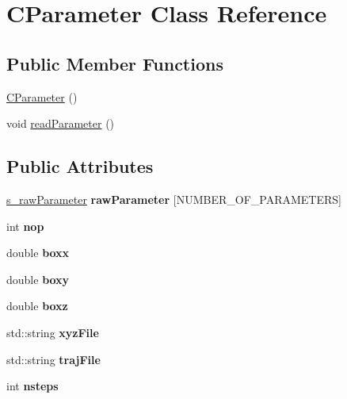 \hypertarget{classCParameter}{}\section{C\+Parameter Class Reference}
\label{classCParameter}
\subsection*{Public Member Functions}
\begin{DoxyCompactItemize}
\item 
\mbox{\hyperlink{classCParameter_aa802146fddbef2877f2034ed3dc16cd6}{C\+Parameter}} ()
\item 
void \mbox{\hyperlink{classCParameter_a026d8da357935e384b478913e036f3bc}{read\+Parameter}} ()
\end{DoxyCompactItemize}
\subsection*{Public Attributes}
\begin{DoxyCompactItemize}
\item 
\mbox{\label{classCParameter_a8c3dd5e12ba81bf46bce96e7172f08d6}} 
\mbox{\hyperlink{structs__rawParameter}{s\+\_\+raw\+Parameter}} {\bfseries raw\+Parameter} \mbox{[}N\+U\+M\+B\+E\+R\+\_\+\+O\+F\+\_\+\+P\+A\+R\+A\+M\+E\+T\+E\+RS\mbox{]}
\item 
\mbox{\label{classCParameter_adce9321ac8e877aff4d4c9fc03f74465}} 
int {\bfseries nop}
\item 
\mbox{\label{classCParameter_ab0abbb096d718eb1deac73e1c47ae324}} 
double {\bfseries boxx}
\item 
\mbox{\label{classCParameter_af770455c1829b9e2ab5cd27b7ea626be}} 
double {\bfseries boxy}
\item 
\mbox{\label{classCParameter_a87d3e3cd240bb45c5d9dcbd6c3cc3bf0}} 
double {\bfseries boxz}
\item 
\mbox{\label{classCParameter_ace7b05009f3403d4abea8a1bea18ded8}} 
std\+::string {\bfseries xyz\+File}
\item 
\mbox{\label{classCParameter_a0b417a4a872ded310baf1c310f55c284}} 
std\+::string {\bfseries traj\+File}
\item 
\mbox{\label{classCParameter_a0d4870d1e8738b7d921e35fa4068b060}} 
int {\bfseries nsteps}
\end{DoxyCompactItemize}



